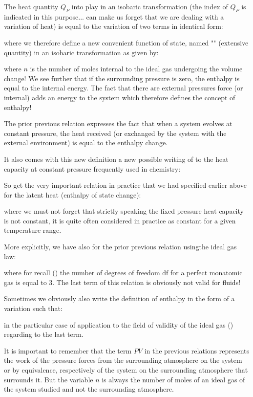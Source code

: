 	The heat quantity $Q_P$ into play in an isobaric transformation (the index of $Q_P$ is indicated in this purpose... can make us forget that we are dealing with a variation of heat) is equal to the variation of two terms in identical form:
	
	where we therefore define a new convenient function of state, named "" (extensive quantity) in an isobaric transformation as given by:
	
	where $n$ is the number of moles internal to the ideal gas undergoing the volume change! We see further that if the surrounding pressure is zero, the enthalpy is equal to the internal energy. The fact that there are external pressures force (or internal) adds an energy to the system which therefore defines the concept of enthalpy!

	The prior previous relation expresses the fact that when a system evolves at constant pressure, the heat received (or exchanged by the system with the external environment) is equal to the enthalpy change.

	It also comes with this new definition a new possible writing of to the heat capacity at constant pressure frequently used in chemistry:
	
	So get the very important relation in practice that we had specified earlier above for the latent heat (enthalpy of state change):
	
	where we must not forget that strictly speaking the fixed pressure heat capacity is not constant, it is quite often considered in practice as constant for a given temperature range.

	More explicitly, we have also for the prior previous relation usingthe ideal gas law:
	
	where for recall () the number of degrees of freedom $\mathrm{df}$ for a perfect monatomic gas is equal to $3$. The last term of this relation is obviously not valid for fluids!

	Sometimes we obviously also write the definition of enthalpy in the form of a variation such that:
	
	in the particular case of application to the field of validity of the ideal gas () regarding to the last term.

	It is important to remember that the term $PV$ in the previous relations represents the work of the pressure forces from the surrounding atmosphere on the system or by equivalence, respectively of the system on the surrounding atmosphere that surrounds it. But the variable $n$ is always the number of moles of an ideal gas of the system studied and not the surrounding atmosphere.

